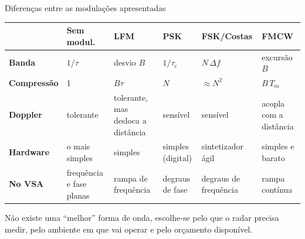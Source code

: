 \documentclass[aspectratio=169, 10pt]{beamer}
\newcommand{\cab}[1]{\textbf{\textcolor{radarcyan}{#1}}}
\begin{document}
\begin{frame}[t]{Diferenças entre as modulações apresentadas}
  \footnotesize
  \renewcommand{\arraystretch}{1.25}
  \begin{tabular}{@{}L{2.3cm}L{1.75cm}L{1.9cm}L{1.9cm}L{1.9cm}L{1.8cm}@{}}
    \toprule
     & \cab{Sem modul.} & \cab{LFM} & \cab{PSK} & \cab{FSK/Costas} & \cab{FMCW} \\
    \midrule
    \textbf{Banda} & $1/\tau$ & desvio $B$ & $1/\tau_c$ & $N\,\Delta f$ & excursão $B$ \\
    \textbf{Compressão} & 1 & $B\tau$ & $N$ & $\approx N^2$ & $B\,T_m$ \\
    \textbf{Doppler} & tolerante & tolerante, mas desloca a distância & sensível & sensível & acopla com a distância \\
    \textbf{Hardware} & o mais simples & simples & simples (digital) & sintetizador ágil & simples e barato \\
    \textbf{No VSA} & frequência e fase planas & rampa de frequência & degraus de fase & degraus de frequência & rampa contínua \\
    \bottomrule
  \end{tabular}
  \vspace{3pt}
    Não existe uma ``melhor'' forma de onda, escolhe-se pelo que o radar precisa medir, pelo ambiente em que vai operar e pelo orçamento disponível.
\end{frame}
\end{document}
